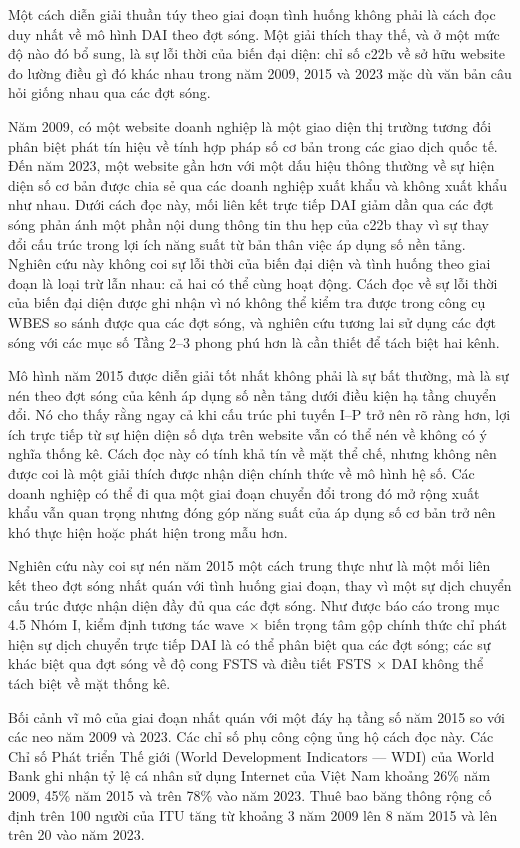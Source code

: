 \documentclass[12pt,a4paper]{article}
\begin{document}
Một cách diễn giải thuần túy theo giai đoạn tình huống không phải là
cách đọc duy nhất về mô hình DAI theo đợt sóng. Một giải thích thay thế,
và ở một mức độ nào đó bổ sung, là sự lỗi thời của biến đại diện: chỉ số
c22b về sở hữu website đo lường điều gì đó khác nhau trong năm 2009,
2015 và 2023 mặc dù văn bản câu hỏi giống nhau qua các đợt sóng.

Năm 2009, có một website doanh nghiệp là một giao diện thị trường tương
đối phân biệt phát tín hiệu về tính hợp pháp số cơ bản trong các giao
dịch quốc tế. Đến năm 2023, một website gần hơn với một dấu hiệu thông
thường về sự hiện diện số cơ bản được chia sẻ qua các doanh nghiệp xuất
khẩu và không xuất khẩu như nhau. Dưới cách đọc này, mối liên kết trực
tiếp DAI giảm dần qua các đợt sóng phản ánh một phần nội dung thông tin
thu hẹp của c22b thay vì sự thay đổi cấu trúc trong lợi ích năng suất từ
bản thân việc áp dụng số nền tảng. Nghiên cứu này không coi sự lỗi thời
của biến đại diện và tình huống theo giai đoạn là loại trừ lẫn nhau: cả
hai có thể cùng hoạt động. Cách đọc về sự lỗi thời của biến đại diện
được ghi nhận vì nó không thể kiểm tra được trong công cụ WBES so sánh
được qua các đợt sóng, và nghiên cứu tương lai sử dụng các đợt sóng với
các mục số Tầng 2--3 phong phú hơn là cần thiết để tách biệt hai kênh.

Mô hình năm 2015 được diễn giải tốt nhất không phải là sự bất thường, mà
là sự nén theo đợt sóng của kênh áp dụng số nền tảng dưới điều kiện hạ
tầng chuyển đổi. Nó cho thấy rằng ngay cả khi cấu trúc phi tuyến I--P
trở nên rõ ràng hơn, lợi ích trực tiếp từ sự hiện diện số dựa trên
website vẫn có thể nén về không có ý nghĩa thống kê. Cách đọc này có
tính khả tín về mặt thể chế, nhưng không nên được coi là một giải thích
được nhận diện chính thức về mô hình hệ số. Các doanh nghiệp có thể đi
qua một giai đoạn chuyển đổi trong đó mở rộng xuất khẩu vẫn quan trọng
nhưng đóng góp năng suất của áp dụng số cơ bản trở nên khó thực hiện
hoặc phát hiện trong mẫu hơn.

Nghiên cứu này coi sự nén năm 2015 một cách trung thực như là một mối
liên kết theo đợt sóng nhất quán với tình huống giai đoạn, thay vì một
sự dịch chuyển cấu trúc được nhận diện đầy đủ qua các đợt sóng. Như được
báo cáo trong mục 4.5 Nhóm I, kiểm định tương tác wave × biến trọng tâm
gộp chính thức chỉ phát hiện sự dịch chuyển trực tiếp DAI là có thể phân
biệt qua các đợt sóng; các sự khác biệt qua đợt sóng về độ cong FSTS và
điều tiết FSTS × DAI không thể tách biệt về mặt thống kê.

Bối cảnh vĩ mô của giai đoạn nhất quán với một đáy hạ tầng số năm 2015
so với các neo năm 2009 và 2023. Các chỉ số phụ công cộng ủng hộ cách
đọc này. Các Chỉ số Phát triển Thế giới (World Development Indicators
--- WDI) của World Bank ghi nhận tỷ lệ cá nhân sử dụng Internet của Việt
Nam khoảng 26\% năm 2009, 45\% năm 2015 và trên 78\% vào năm 2023. Thuê
bao băng thông rộng cố định trên 100 người của ITU tăng từ khoảng 3 năm
2009 lên 8 năm 2015 và lên trên 20 vào năm 2023.
\end{document}
